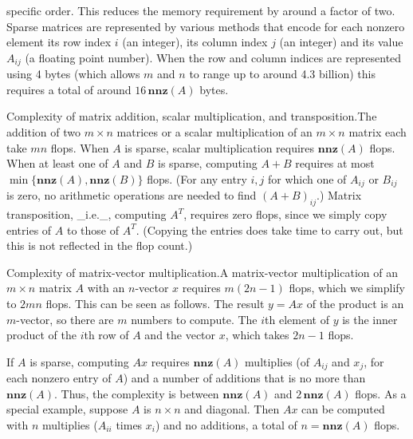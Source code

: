 specific order. This reduces the memory requirement by around a factor of two. Sparse matrices are represented by various methods that encode for each nonzero element its row index \(i\) (an integer), its column index \(j\) (an integer) and its value \(A_{ij}\) (a floating point number). When the row and column indices are represented using 4 bytes (which allows \(m\) and \(n\) to range up to around 4.3 billion) this requires a total of around \(16\,\mathbf{nnz}(A)\) bytes.

Complexity of matrix addition, scalar multiplication, and transposition.The addition of two \(m\times n\) matrices or a scalar multiplication of an \(m\times n\) matrix each take \(mn\) flops. When \(A\) is sparse, scalar multiplication requires \(\mathbf{nnz}(A)\) flops. When at least one of \(A\) and \(B\) is sparse, computing \(A+B\) requires at most \(\min\{\mathbf{nnz}(A),\mathbf{nnz}(B)\}\) flops. (For any entry \(i,j\) for which one of \(A_{ij}\) or \(B_{ij}\) is zero, no arithmetic operations are needed to find \((A+B)_{ij}\).) Matrix transposition, _i.e._, computing \(A^{T}\), requires zero flops, since we simply copy entries of \(A\) to those of \(A^{T}\). (Copying the entries does take time to carry out, but this is not reflected in the flop count.)

Complexity of matrix-vector multiplication.A matrix-vector multiplication of an \(m\times n\) matrix \(A\) with an \(n\)-vector \(x\) requires \(m(2n-1)\) flops, which we simplify to \(2mn\) flops. This can be seen as follows. The result \(y=Ax\) of the product is an \(m\)-vector, so there are \(m\) numbers to compute. The \(i\)th element of \(y\) is the inner product of the \(i\)th row of \(A\) and the vector \(x\), which takes \(2n-1\) flops.

If \(A\) is sparse, computing \(Ax\) requires \(\mathbf{nnz}(A)\) multiplies (of \(A_{ij}\) and \(x_{j}\), for each nonzero entry of \(A\)) and a number of additions that is no more than \(\mathbf{nnz}(A)\). Thus, the complexity is between \(\mathbf{nnz}(A)\) and \(2\,\mathbf{nnz}(A)\) flops. As a special example, suppose \(A\) is \(n\times n\) and diagonal. Then \(Ax\) can be computed with \(n\) multiplies (\(A_{ii}\) times \(x_{i}\)) and no additions, a total of \(n=\mathbf{nnz}(A)\) flops.

 